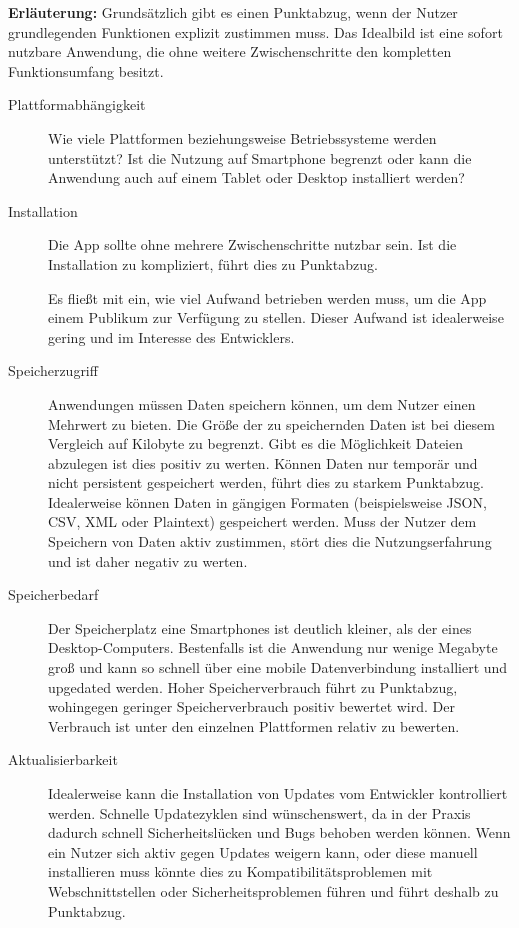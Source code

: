 \textbf{Erläuterung:}
Grundsätzlich gibt es einen Punktabzug, wenn der Nutzer grundlegenden Funktionen explizit zustimmen muss. Das Idealbild ist eine sofort nutzbare Anwendung, die ohne weitere Zwischenschritte den kompletten Funktionsumfang besitzt.
\begin{description}
	\item [Plattformabhängigkeit]
	      Wie viele Plattformen beziehungsweise Betriebssysteme werden unterstützt?
	      Ist die Nutzung auf Smartphone begrenzt oder kann die Anwendung auch auf einem Tablet oder Desktop installiert werden?

	\item [Installation]
	      Die App sollte ohne mehrere Zwischenschritte nutzbar sein. Ist die Installation zu kompliziert, führt dies zu Punktabzug.

	      Es fließt mit ein, wie viel Aufwand betrieben werden muss, um die App einem Publikum zur Verfügung zu stellen. Dieser Aufwand ist idealerweise gering und im Interesse des Entwicklers.

	\item [Speicherzugriff]
	      Anwendungen müssen Daten speichern können, um dem Nutzer einen Mehrwert zu bieten. Die Größe der zu speichernden Daten ist bei diesem Vergleich auf Kilobyte zu begrenzt. Gibt es die Möglichkeit Dateien abzulegen ist dies positiv zu werten.
	      Können Daten nur temporär und nicht persistent gespeichert werden, führt dies zu starkem Punktabzug. Idealerweise können Daten in gängigen Formaten (beispielsweise JSON, CSV, XML oder Plaintext) gespeichert werden. Muss der Nutzer dem Speichern von Daten aktiv zustimmen, stört dies die Nutzungserfahrung und ist daher negativ zu werten.

	\item [Speicherbedarf]
	      Der Speicherplatz eine Smartphones ist deutlich kleiner, als der eines Desktop-Computers. Bestenfalls ist die Anwendung nur wenige Megabyte groß und kann so schnell über eine mobile Datenverbindung installiert und upgedated werden.
	      Hoher Speicherverbrauch führt zu Punktabzug, wohingegen geringer Speicherverbrauch positiv bewertet wird. Der Verbrauch ist unter den einzelnen Plattformen relativ zu bewerten.

	\item [Aktualisierbarkeit]
	      Idealerweise kann die Installation von Updates vom Entwickler kontrolliert werden. Schnelle Updatezyklen sind wünschenswert, da in der Praxis dadurch schnell Sicherheitslücken und Bugs behoben werden können. Wenn ein Nutzer sich aktiv gegen Updates weigern kann, oder diese manuell installieren muss könnte dies zu Kompatibilitätsproblemen mit Webschnittstellen oder Sicherheitsproblemen führen und führt deshalb zu Punktabzug.


\end{description}
